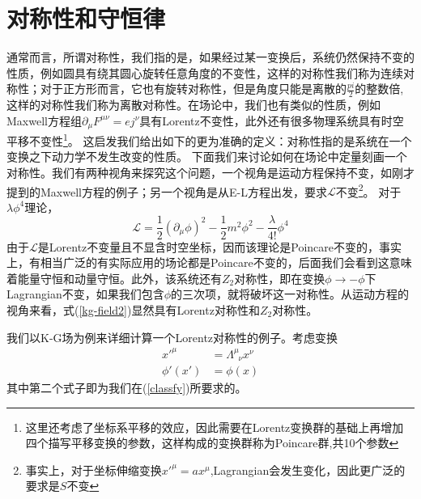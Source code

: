 \section{对称性和守恒律}
 通常而言，所谓对称性，我们指的是，如果经过某一变换后，系统仍然保持不变的性质，例如圆具有绕其圆心旋转任意角度的不变性，这样的对称性我们称为连续对称性；对于正方形而言，它也有旋转对称性，但是角度只能是离散的$\frac{pi}{2}$的整数倍,这样的对称性我们称为离散对称性。在场论中，我们也有类似的性质，例如Maxwell方程组$\partial_{\mu}F^{\mu\nu}=ej^{\nu}$具有Lorentz不变性，此外还有很多物理系统具有时空平移不变性\footnote{这里还考虑了坐标系平移的效应，因此需要在Lorentz变换群的基础上再增加四个描写平移变换的参数，这样构成的变换群称为Poincare群,共10个参数}。
 这启发我们给出如下的更为准确的定义：对称性指的是系统在一个变换之下动力学不发生改变的性质。
下面我们来讨论如何在场论中定量刻画一个对称性。我们有两种视角来探究这个问题，一个视角是运动方程保持不变，如刚才提到的Maxwell方程的例子；另一个视角是从E-L方程出发，要求$\mathcal{L}$不变\footnote{事实上，对于坐标伸缩变换$x'^{\mu}=ax^{\mu}$,Lagrangian会发生变化，因此更广泛的要求是$S$不变}。
对于$\lambda \phi^{4}$理论，
\begin{equation}
\mathcal{L}=\frac{1}{2}(\partial_{\mu}\phi)^{2}-\frac{1}{2}m^{2}\phi^{2}-\frac{\lambda}{4!}\phi^{4}
\end{equation}
由于$\mathcal{L}$是Lorentz不变量且不显含时空坐标，因而该理论是Poincare不变的，事实上，有相当广泛的有实际应用的场论都是Poincare不变的，后面我们会看到这意味着能量守恒和动量守恒。此外，该系统还有$Z_{2}$对称性，即在变换$\phi \rightarrow -\phi$下Lagrangian不变，如果我们包含$\phi$的三次项，就将破坏这一对称性。从运动方程的视角来看，式(\ref{kg-field2})显然具有Lorentz对称性和$Z_{2}$对称性。

我们以K-G场为例来详细计算一个Lorentz对称性的例子。考虑变换
\begin{equation}
    \begin{aligned}
        x'^{\mu}&=\Lambda^{\mu}_{\;\;\nu}x^{\nu}\\
        \phi'(x')&= \phi(x)
    \end{aligned}
\end{equation}
其中第二个式子即为我们在(\ref{classfy})所要求的。

